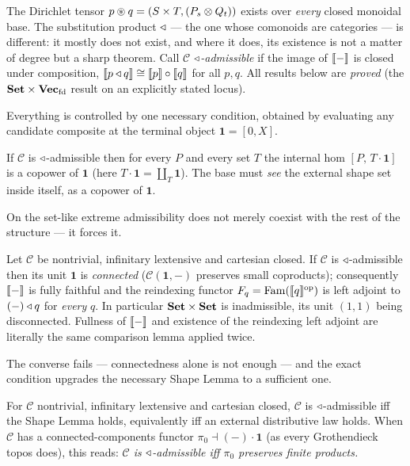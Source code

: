 The Dirichlet tensor $p\circledast q=(S\times T,(P_s\otimes Q_t))$ exists over
\emph{every} closed monoidal base. The substitution product $\triangleleft$ --- the one
whose comonoids are categories --- is different: it mostly does not exist, and
where it does, its existence is not a matter of degree but a sharp theorem. Call
$\mathcal{C}$ \emph{$\triangleleft$-admissible} if the image of $\llbracket - \rrbracket$ is closed under
composition, $\llbracket p\triangleleft q \rrbracket\cong\llbracket p \rrbracket\circ\llbracket q \rrbracket$ for all $p,q$. All results
below are \emph{proved} (the $\mathbf{Set}\times\mathbf{Vec}_{\mathrm{fd}}$ result on an
explicitly stated locus).

Everything is controlled by one necessary condition, obtained by evaluating any
candidate composite at the terminal object $\mathbf{1}=[0,X]$.

\begin{lemma}\label{lem:cob-shape}
If $\mathcal{C}$ is $\triangleleft$-admissible then for every $P$ and every set $T$ the
internal hom $[P,\,T\cdot\mathbf{1}]$ is a copower of $\mathbf{1}$ (here
$T\cdot\mathbf{1}=\coprod_T\mathbf{1}$). The base must \emph{see} the external
shape set inside itself, as a copower of $\mathbf{1}$.
\end{lemma}

On the set-like extreme admissibility does not merely coexist with the rest of the
structure --- it forces it.

\begin{theorem}\label{thm:cob-rigidity}
Let $\mathcal{C}$ be nontrivial, infinitary lextensive and cartesian closed. If
$\mathcal{C}$ is $\triangleleft$-admissible then its unit $\mathbf{1}$ is \emph{connected}
($\mathcal{C}(\mathbf{1},-)$ preserves small coproducts); consequently $\llbracket - \rrbracket$
is fully faithful and the reindexing functor $F_q=\mathrm{Fam}(\llbracket q \rrbracket^{\mathrm{op}})$ is left
adjoint to $(-)\triangleleft q$ for \emph{every} $q$. In particular $\mathbf{Set}\times\mathbf{Set}$ is
inadmissible, its unit $(1,1)$ being disconnected. Fullness of $\llbracket - \rrbracket$ and
existence of the reindexing left adjoint are literally the same comparison lemma
applied twice.
\end{theorem}

The converse fails --- connectedness alone is not enough --- and the exact
condition upgrades the necessary Shape Lemma to a sufficient one.

\begin{theorem}\label{thm:cob-char}
For $\mathcal{C}$ nontrivial, infinitary lextensive and cartesian closed,
$\mathcal{C}$ is $\triangleleft$-admissible iff the Shape Lemma holds, equivalently iff an
external distributive law holds. When $\mathcal{C}$ has a connected-components
functor $\pi_0\dashv(-)\cdot\mathbf{1}$ (as every Grothendieck topos does), this
reads: \emph{$\mathcal{C}$ is $\triangleleft$-admissible iff $\pi_0$ preserves finite
products.}
\end{theorem}

